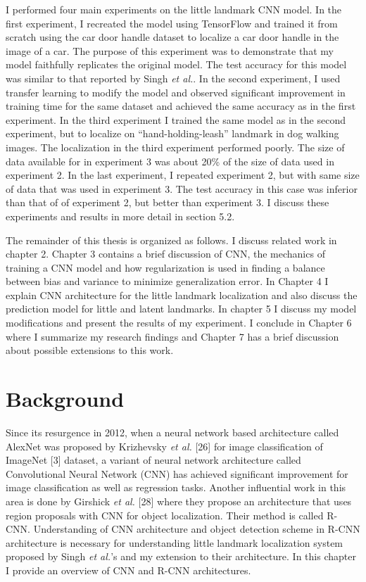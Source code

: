 \documentclass [11pt,letterpaper ,twoside ,openany ]{report}
\begin{document}
    I performed four main experiments on the little landmark CNN model. In the first experiment, I recreated the model using TensorFlow\textsuperscript{\textregistered} and trained it from scratch using the car door handle dataset to localize a car door handle in the image of a car. The purpose of this experiment was to demonstrate that my model faithfully replicates the original model. The test accuracy for this model was similar to that reported by Singh \textit{et al.}. In the second experiment, I used transfer learning to modify the model and observed significant improvement in training time for the same dataset and achieved the same accuracy as in the first experiment. In the third experiment I trained the same model as in the second experiment, but to localize on ``hand-holding-leash'' landmark in dog walking images. The localization in the third experiment performed poorly. The size of data available for in experiment 3 was about 20\% of the size of data used in experiment 2. In the last experiment, I repeated experiment 2, but with same size of data that was used in experiment 3. The test accuracy in this case was inferior than that of of experiment 2, but better than experiment 3. I discuss these experiments and results in more detail in section 5.2.

    The remainder of this thesis is organized as follows. I discuss related work in chapter 2. Chapter 3 contains a brief discussion of CNN, the mechanics of training a CNN model and how regularization is used in finding a balance between bias and variance to minimize generalization error. In Chapter 4 I explain CNN architecture for the little landmark localization and also discuss the prediction model for little and latent landmarks. In chapter 5 I discuss my model modifications and present the results of my experiment. I conclude in Chapter 6 where I summarize my research findings and Chapter 7 has a brief discussion about possible extensions to this work.

    \chapter{Background}
    \doublespacing
    Since its resurgence in 2012, when a neural network based architecture called AlexNet was proposed by Krizhevsky \textit {et al.} [26] for image classification of ImageNet [3] dataset, a variant of neural network architecture called Convolutional Neural Network (CNN) has achieved significant improvement for image classification as well as regression tasks. Another influential work in this area is done by Girshick \textit{et al.} [28] where they propose an architecture that uses region proposals with CNN for object localization. Their method is called R-CNN. Understanding of CNN architecture and object detection scheme in R-CNN architecture is necessary for understanding little landmark localization system proposed by Singh \textit{et al.}'s and my extension to their architecture. In this chapter I provide an overview of CNN and R-CNN architectures. 
\end{document}
